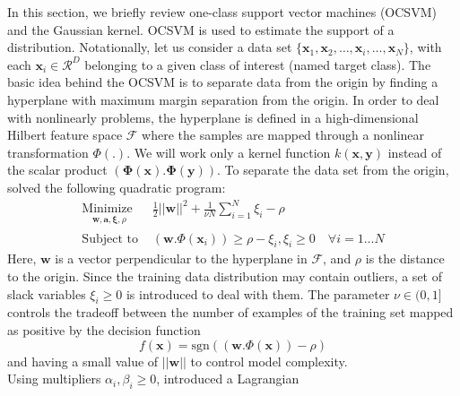 \documentclass[conference]{IEEEtran}
\begin{document}
In this section, we briefly review one-class support vector machines (OCSVM) \cite{scholkopf2001estimating} and the Gaussian kernel. OCSVM is used to estimate the support of a distribution.
Notationally, let us consider a data set $\{\mathbf{x}_1,\mathbf{x}_2,\ldots,\mathbf{x}_i, \ldots,\mathbf{x}_N\}$, 
with each $\mathbf{x}_i\in \mathcal{R}^D$ belonging to a given class of interest (named target class). 
The basic idea behind the OCSVM is to separate data from the origin by finding a hyperplane with maximum margin separation from
the origin. In order to deal with nonlinearly problems, the hyperplane is defined in a high-dimensional Hilbert feature space $\mathcal{F}$ where
the samples are mapped through a nonlinear transformation $\Phi(.)$. We will work only a kernel function $k(\mathbf{x},\mathbf{y})$ instead of the scalar 
product $(\boldsymbol{\Phi}(\mathbf{x}).\boldsymbol{\Phi}(\mathbf{y}))$. To separate the data set from the 
origin, \cite{scholkopf2001estimating} solved the following quadratic program:
\begin{subequations}\label{euq:ocsvm}
\begin{align}
\underset{
	\begin{array}{c}
		 \mathbf{w}, \mathbf{a}, \boldsymbol{\xi}, \rho
	\end{array}}{\text{Minimize }} & \frac{1}{2}\left|\left| \mathbf{w}\right|\right|^2 + \frac{1}{\nu N}\sum_{i=1}^N\xi_i -\rho\\
	\label{euq:constraints}
\text{Subject to } &  (\mathbf{w}.\Phi(\mathbf{x}_i))\geq \rho -\xi_i, \xi_i \ge 0 \quad \forall i=1\ldots N
\end{align}
\end{subequations}
Here, $\mathbf{w}$ is a vector perpendicular to the hyperplane in $\mathcal{F}$, and $\rho$ is the 
distance to the origin. Since the training data distribution
may contain outliers, a set of slack variables $\xi_i\geq0$ is introduced to deal with them. The
parameter $\nu \in (0,1]$ controls the tradeoff between the number
of examples of the training set mapped as positive by the
decision function
\begin{equation}
\label{equ:defosvm}
f(\mathbf{x})=\text{sgn}((\mathbf{w}.\Phi(\mathbf{x}))- \rho)
\end{equation}
and having a small value of $\left|\left| \mathbf{w}\right|\right|$ to control model complexity.\\

Using multipliers $\alpha_i,\beta_i\geq0$, \cite{scholkopf2001estimating} introduced a Lagrangian
\end{document}
